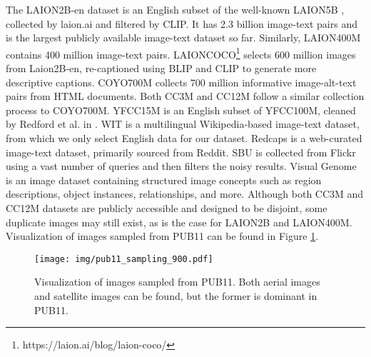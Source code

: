 \documentclass[journal]{IEEEtran}
\begin{document}
The LAION2B-en dataset is an English subset of the well-known LAION5B \cite{laion5b}, collected by laion.ai and filtered by CLIP. It has 2.3 billion image-text pairs and is the largest publicly available image-text dataset so far. Similarly, LAION400M contains 400 million image-text pairs. LAIONCOCO\footnote{https://laion.ai/blog/laion-coco/} selects 600 million images from Laion2B-en, re-captioned using BLIP and CLIP to generate more descriptive captions. COYO700M collects 700 million informative image-alt-text pairs from HTML documents. Both CC3M and CC12M follow a similar collection process to COYO700M. YFCC15M is an English subset of YFCC100M, cleaned by Redford et al. in \cite{clip}. WIT is a multilingual Wikipedia-based image-text dataset, from which we only select English data for our dataset. Redcaps is a web-curated image-text dataset, primarily sourced from Reddit. SBU is collected from Flickr using a vast number of queries and then filters the noisy results. Visual Genome is an image dataset containing structured image concepts such as region descriptions, object instances, relationships, and more. Although both CC3M and CC12M datasets are publicly accessible and designed to be disjoint, some duplicate images may still exist, as is the case for LAION2B and LAION400M. Visualization of images sampled from PUB11 can be found in Figure \ref{fig:pub11_pure_image}.


\begin{figure}[ht]
    \centering
    \texttt{[image: img/pub11\_sampling\_900.pdf]}
    \caption{Visualization of images sampled from PUB11. Both aerial images and satellite images can be found, but the former is dominant in PUB11.}
    \label{fig:pub11_pure_image}
\end{figure}
\end{document}
